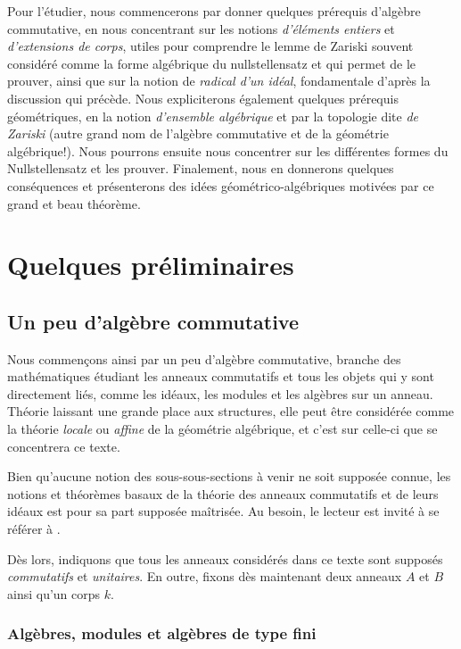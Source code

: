 \documentclass[10pt, twoside]{article}
\theoremstyle{plain}
\theoremstyle{definition}
\theoremstyle{plain}
\theoremstyle{plain}
\theoremstyle{definition}
\theoremstyle{remark}
\begin{document}
Pour l'étudier, nous commencerons par donner quelques prérequis d'algèbre commutative, en nous concentrant sur les notions \textit{d'éléments entiers} et \textit{d'extensions de corps}, utiles pour comprendre le lemme de Zariski souvent considéré comme la forme algébrique du nullstellensatz et qui permet de le prouver, ainsi que sur la notion de \textit{radical d'un idéal}, fondamentale d'après la discussion qui précède. Nous expliciterons également quelques prérequis géométriques, en la notion \textit{d'ensemble algébrique} et par la topologie dite \textit{de Zariski} (autre grand nom de l'algèbre commutative et de la géométrie algébrique!). Nous pourrons ensuite nous concentrer sur les différentes formes du Nullstellensatz et les prouver. Finalement, nous en donnerons quelques conséquences et présenterons des idées géométrico-algébriques motivées par ce grand et beau théorème.

\newpage
\section{Quelques préliminaires}
\subsection{Un peu d'algèbre commutative}
Nous commençons ainsi par un peu d'algèbre commutative, branche des mathématiques étudiant les anneaux commutatifs et tous les objets qui y sont directement liés, comme les idéaux, les modules et les algèbres sur un anneau. Théorie laissant une grande place aux structures, elle peut être considérée comme la théorie \textit{locale} ou \textit{affine} de la géométrie algébrique, et c'est sur celle-ci que se concentrera ce texte.

Bien qu'aucune notion des sous-sous-sections à venir ne soit supposée connue, les notions et théorèmes basaux de la théorie des anneaux commutatifs et de leurs idéaux est pour sa part supposée maîtrisée. Au besoin, le lecteur est invité à se référer à \cite{Berhuy}.

Dès lors, indiquons que tous les anneaux considérés dans ce texte sont supposés \textit{commutatifs} et \textit{unitaires}. En outre, fixons dès maintenant deux anneaux $A$ et $B$ ainsi qu'un corps $k$.

\subsubsection{Algèbres, modules et algèbres de type fini}
\end{document}

